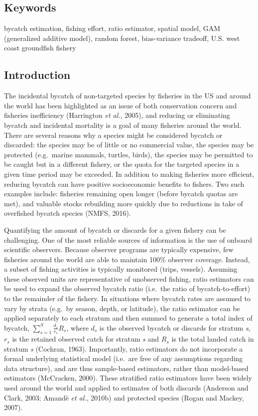 \documentclass[]{article}
\begin{document}
\subsection{Keywords}\label{keywords}

bycatch estimation, fishing effort, ratio estimator, spatial model, GAM
(generalized additive model), random forest, bias-variance tradeoff,
U.S. west coast groundfish fishery

\subsection{Introduction}\label{introduction}

The incidental bycatch of non-targeted species by fisheries in the US
and around the world has been highlighted as an issue of both
conservation concern and fisheries inefficiency (Harrington \emph{et
al.}, 2005), and reducing or eliminating bycatch and incidental
mortality is a goal of many fisheries around the world. There are
several reasons why a species might be considered bycatch or discarded:
the species may be of little or no commercial value, the species may be
protected (e.g.~marine mammals, turtles, birds), the species may be
permitted to be caught but in a different fishery, or the quota for the
targeted species in a given time period may be exceeded. In addition to
making fisheries more efficient, reducing bycatch can have positive
socioeconomic benefits to fishers. Two such examples include: fisheries
remaining open longer (before bycatch quotas are met), and valuable
stocks rebuilding more quickly due to reductions in take of overfished
bycatch species (NMFS, 2016).

Quantifying the amount of bycatch or discards for a given fishery can be
challenging. One of the most reliable sources of information is the use
of onboard scientific observers. Because observer programs are typically
expensive, few fisheries around the world are able to maintain 100\%
observer coverage. Instead, a subset of fishing activities is typically
monitored (trips, vessels). Assuming these observed units are
representative of unobserved fishing, ratio estimators can be used to
expand the observed bycatch ratio (i.e.~the ratio of bycatch-to-effort)
to the remainder of the fishery. In situations where bycatch rates are
assumed to vary by strata (e.g.~by season, depth, or latitude), the
ratio estimator can be applied separately to each stratum and then
summed to generate a total index of bycatch,
\(\sum_{ s=1 }^{ S }{ \frac { { d }_{ s } }{ { r }_{ s } } } { R }_{ s }\),
where \({ d }_{ s }\) is the observed bycatch or discards for stratum
\emph{s}, \({ r }_{ s }\) is the retained observed catch for stratum
\emph{s} and \({ R }_{ s }\) is the total landed catch in stratum
\emph{s} (Cochran, 1963). Importantly, ratio estimators do not
incorporate a formal underlying statistical model (i.e.~are free of any
assumptions regarding data structure), and are thus sample-based
estimators, rather than model-based estimators (McCracken, 2000). These
stratified ratio estimators have been widely used around the world and
applied to estimates of both discards (Anderson and Clark, 2003; Amandè
\emph{et al.}, 2010b) and protected species (Rogan and Mackey, 2007).
\end{document}
